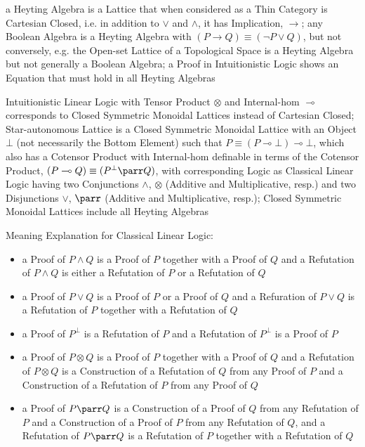 a Heyting Algebra is a Lattice that when considered as a Thin Category is
Cartesian Closed, i.e. in addition to $\vee$ and $\wedge$, it has Implication,
$\rightarrow$; any Boolean Algebra is a Heyting Algebra with $(P \rightarrow Q)
\equiv (\neg{P}\vee{Q})$, but not conversely, e.g. the Open-set Lattice of a
Topological Space is a Heyting Algebra but not generally a Boolean Algebra; a
Proof in Intuitionistic Logic shows an Equation that must hold in all Heyting
Algebras

Intuitionistic Linear Logic with Tensor Product $\otimes$ and Internal-hom
$\multimap$ corresponds to Closed Symmetric Monoidal Lattices instead of
Cartesian Closed; Star-autonomous Lattice is a Closed Symmetric Monoidal
Lattice with an Object $\bot$ (not necessarily the Bottom Element) such that $P
\equiv (P \multimap \bot) \multimap \bot$, which also has a Cotensor Product
with Internal-hom definable in terms of the Cotensor Product, $(P \multimap Q)
\equiv (P^\bot \parr Q)$, with corresponding Logic as Classical Linear Logic
having two Conjunctions $\wedge$, $\otimes$ (Additive and Multiplicative,
resp.) and two Disjunctions $\vee$, $\parr$ (Additive and Multiplicative,
resp.); Closed Symmetric Monoidal Lattices include all Heyting Algebras

Meaning Explanation for Classical Linear Logic:
\begin{itemize}
  \item a Proof of $P \wedge Q$ is a Proof of $P$ together with a Proof of $Q$
    and a Refutation of $P \wedge Q$ is either a Refutation of $P$ or a
    Refutation of $Q$
  \item a Proof of $P \vee Q$ is a Proof of $P$ or a Proof of $Q$ and a
    Refuration of $P \vee Q$ is a Refutation of $P$ together with a Refutation
    of $Q$
  \item a Proof of $P^\bot$ is a Refutation of $P$ and a Refutation of $P^\bot$
    is a Proof of $P$
  \item a Proof of $P \otimes Q$ is a Proof of $P$ together with a Proof of $Q$
    and a Refutation of $P \otimes Q$ is a Construction of a Refutation of $Q$
    from any Proof of $P$ and a Construction of a Refutation of $P$ from any
    Proof of $Q$
  \item a Proof of $P \parr Q$ is a Construction of a Proof of $Q$ from any
    Refutation of $P$ and a Construction of a Proof of $P$ from any Refutation
    of $Q$, and a Refutation of $P \parr Q$ is a Refutation of $P$ together
    with a Refutation of $Q$
\end{itemize}

